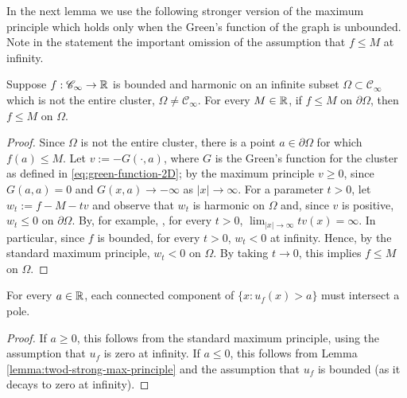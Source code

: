 \documentclass[12pt]{amsart}
\numberwithin{equation}{section}
\begin{document}
	In the next lemma we use the following stronger version of the maximum principle which holds only when the Green's function of the graph is unbounded. 
	Note in the statement the important omission of the assumption that $f \leq M$ at infinity.  
	\begin{lemma} \label{lemma:twod-strong-max-principle}
		Suppose $f: \mathscr{C}_{\infty} \to \operatorname{\mathbb{R}}$ is bounded and harmonic on an infinite subset $\Omega \subset \mathscr{C}_{\infty}$
		which is not the entire cluster, $\Omega \neq \mathscr{C}_{\infty}$. For every $M \in \operatorname{\mathbb{R}}$, if $f \leq M$ on $\partial \Omega$, then $f \leq M$ on $\Omega$.
	\end{lemma}
	\begin{proof}
		Since $\Omega$ is not the entire cluster, there is a point $a \in \partial \Omega$ for which $f(a) \leq M$. 
		Let $v := -G(\cdot, a)$, where $G$ is the Green's function for the cluster as defined in \eqref{eq:green-function-2D}; by the maximum principle $v \geq 0$, since $G(a,a) = 0$ and $G(x , a) \to -\infty$ as $|x| \to \infty$. 
		For a parameter $t > 0$, let $w_t :=  f - M - t v$ and observe that $w_t$ is harmonic on $\Omega$ and, since $v$ is positive, 
		$w_t  \leq 0$ on $\partial \Omega$. By, for example, \cite{BH09}, for every $t > 0$, $\lim_{|x| \to \infty} t v(x) = \infty$. 
		In particular, since $f$ is bounded, for every $t > 0$, $w_t < 0$ at infinity. Hence, by the standard maximum principle, $w_t < 0$ on $\Omega$. 
		By taking $t \to 0$, this implies $f \leq M$ on $\Omega$. 
	\end{proof}
	
	
	
	
	\begin{lemma} \label{lemma:poles-sub-super-level-sets}
		For every $a \in \operatorname{\mathbb{R}}$, each connected component of $\{x : u_f(x) > a \}$ must intersect a pole. 
	\end{lemma}
	\begin{proof}
		If $a \geq 0$, this follows from the standard maximum principle, using the assumption that $u_f$ is zero at infinity. If $a \leq 0$, this 
		follows from Lemma \ref{lemma:twod-strong-max-principle} and the assumption that $u_f$ is bounded (as it decays to zero at infinity).  \end{proof}
	
	
	
\end{document}
